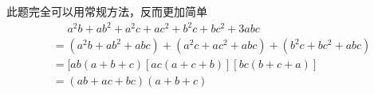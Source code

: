 \documentclass[windows,csize4]{BHCexam}
\begin{document}
\begin{groups}
\begin{questions}[]
\begin{solution}{0.5cm}
            \method 此题完全可以用常规方法，反而更加简单
            \[
                \begin{aligned}
                    & \phantom{=} a^2b+ab^2+a^2c+ac^2+b^2c+bc^2+3abc \\
                    &= (a^2b+ab^2 +abc) +(a^2c+ac^2+abc)+(b^2c+bc^2+abc) \\
                    &= [ab(a+b+c)[ac(a+c+b)][bc(b+c+a)] \\
                    &= (ab+ac+bc)(a+b+c)
                \end{aligned}
            \]

        \end{solution}

    \end{questions}
\end{groups}



\label{lastpage}
\end{document}
